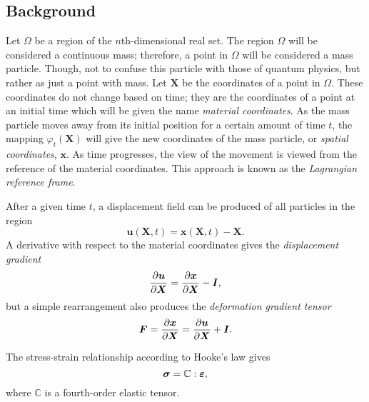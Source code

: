 \subsection{Background}
Let $\Omega$ be a region of the $n$th-dimensional real set. The region $\Omega$ will be considered a continuous mass; therefore, a point in $\Omega$ will be considered a mass particle. Though, not to confuse this particle with those of quantum physics, but rather as just a point with mass. Let $\bm{X}$ be the coordinates of a point in $\Omega$. These coordinates do not change based on time; they are the coordinates of a point at an initial time which will be given the name \textit{material coordinates}. As the mass particle moves away from its initial position for a certain amount of time $t$, the mapping $\varphi_t(\bm{X})$ will give the new coordinates of the mass particle, or \textit{spatial coordinates}, $\bm{x}$. As time progresses, the view of the movement is viewed from the reference of the material coordinates. This approach is known as the \textit{Lagrangian reference frame}.

After a given time $t$, a displacement field can be produced of all particles in the region
\begin{equation}
  \bm{u}(\bm{X},t) = \bm{x}(\bm{X},t) - \bm{X}.
\end{equation}
A derivative with respect to the material coordinates gives the \textit{displacement gradient}
\begin{equation}
  \frac{\partial\bm{u}}{\partial\bm{X}} = \frac{\partial\bm{x}}{\partial\bm{X}} - \bm{I},
\end{equation}
but a simple rearrangement also produces the \textit{deformation gradient tensor}
\begin{equation}
  \bm{F} = \frac{\partial\bm{x}}{\partial\bm{X}} = \frac{\partial\bm{u}}{\partial\bm{X}} + \bm{I}.
\end{equation}

The stress-strain relationship according to Hooke's law gives
\begin{equation}
  \label{eq::Hookes_Law}
  \bm{\sigma} = \mathbb{C}:\bm{\varepsilon},
\end{equation}
where $\mathbb{C}$ is a fourth-order elastic tensor.
